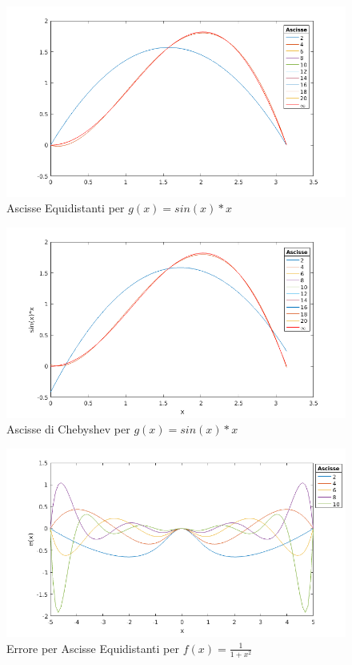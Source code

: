 \begin{figure}
\includegraphics[width=\textwidth]{cap_4/es2/Sin_equi.png}
\caption{Ascisse Equidistanti per $g(x) = sin(x)*x$}
\label{SinEq}
\end{figure}

\begin{figure}
\includegraphics[width=\textwidth]{cap_4/es2/Sin_cheb.png}
\caption{Ascisse di Chebyshev per $g(x) = sin(x)*x$}
\label{SinChe}
\end{figure}

\begin{figure}
\includegraphics[width=\textwidth]{cap_4/es2/Runge_equi_err.png}
\caption{Errore per Ascisse Equidistanti per $f(x) = \frac{1}{1+x^2}$}
\label{RungeEqErr}
\end{figure}

